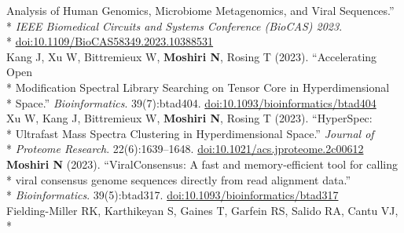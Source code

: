 \documentclass[margin,line]{res}
\begin{document}
\begin{resume}
\hspace*{9.5mm} Analysis of Human Genomics, Microbiome Metagenomics, and Viral Sequences.''\\*
\hspace*{9.5mm} \textit{IEEE Biomedical Circuits and Systems Conference (BioCAS) 2023}.\\*\vspace{2mm}
\hspace*{8mm} \href{https://doi.org/10.1109/BioCAS58349.2023.10388531}{doi:10.1109/BioCAS58349.2023.10388531}\\
\hspace*{4mm} Kang J, Xu W, Bittremieux W, \textbf{Moshiri N}, Rosing T (2023). ``Accelerating Open\\*
\hspace*{9.5mm} Modification Spectral Library Searching on Tensor Core in Hyperdimensional\\*\vspace{2mm}
\hspace*{8.5mm} Space.'' \textit{Bioinformatics}. 39(7):btad404. \href{https://doi.org/10.1093/bioinformatics/btad404}{doi:10.1093/bioinformatics/btad404}\\
\hspace*{4mm} Xu W, Kang J, Bittremieux W, \textbf{Moshiri N}, Rosing T (2023). ``HyperSpec:\\*
\hspace*{9.5mm} Ultrafast Mass Spectra Clustering in Hyperdimensional Space.'' \textit{Journal of}\\*\vspace{2mm}
\hspace*{8mm} \textit{Proteome Research}. 22(6):1639--1648. \href{https://doi.org/10.1021/acs.jproteome.2c00612}{doi:10.1021/acs.jproteome.2c00612}\\
\hspace*{4mm} \textbf{Moshiri N} (2023). ``ViralConsensus: A fast and memory-efficient tool for calling\\*
\hspace*{9.5mm} viral consensus genome sequences directly from read alignment data.''\\*\vspace{2mm}
\hspace*{8mm} \textit{Bioinformatics}. 39(5):btad317. \href{https://doi.org/10.1093/bioinformatics/btad317}{doi:10.1093/bioinformatics/btad317}\\
\hspace*{4mm} Fielding-Miller RK, Karthikeyan S, Gaines T, Garfein RS, Salido RA, Cantu VJ,\\*

\end{resume}
\end{document}
